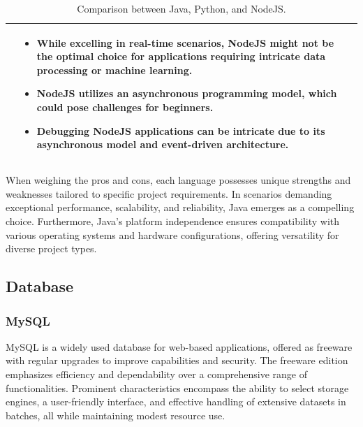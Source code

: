 \begin{table}[H]
\begin{tabular}{| c | p{} | p{} |}
                    &   \begin{itemize}[leftmargin=*,topsep=0pt,partopsep=0pt,parsep=0pt]
                            \item While excelling in real-time scenarios, NodeJS might not be the optimal choice for applications requiring intricate data processing or machine learning.
                            \item NodeJS utilizes an asynchronous programming model, which could pose challenges for beginners.
                            \item Debugging NodeJS applications can be intricate due to its asynchronous model and event-driven architecture.
                    \end{itemize} \\ \hline
    \end{tabular}
    \caption{Comparison between Java, Python, and NodeJS.}
\end{table}

When weighing the pros and cons, each language possesses unique strengths and weaknesses tailored to specific project requirements. In scenarios demanding exceptional performance, scalability, and reliability, Java emerges as a compelling choice. Furthermore, Java's platform independence ensures compatibility with various operating systems and hardware configurations, offering versatility for diverse project types.

\newpage
\subsection{Database}

\subsubsection{MySQL}

MySQL is a widely used database for web-based applications, offered as freeware with regular upgrades to improve capabilities and security. The freeware edition emphasizes efficiency and dependability over a comprehensive range of functionalities. Prominent characteristics encompass the ability to select storage engines, a user-friendly interface, and effective handling of extensive datasets in batches, all while maintaining modest resource use.

